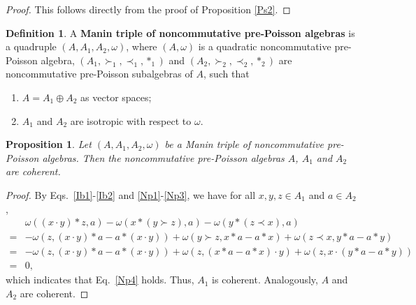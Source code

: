 \documentclass[12pt]{amsart}
\newtheorem{pro}[thm]{Proposition}
\theoremstyle{definition}
\newtheorem{defi}[thm]{Definition}
\begin{document}
\begin{proof} This follows directly from the proof of Proposition \ref{Ps2}. \end{proof}

\begin{defi}\label{defi:Manin}
  A {\bf Manin triple of noncommutative pre-Poisson algebras} is a quadruple $(A,A_1,A_2,\omega)$, 
  where $(A,\omega)$ is a quadratic noncommutative pre-Poisson algebra, 
  $(A_1,\succ_1,\prec_1,\ast_1)$ and $(A_2,\succ_2,\prec_2,\ast_2)$ are noncommutative pre-Poisson subalgebras of $A$,
  such that
  \begin{enumerate}
\item $A=A_1\oplus A_2$ as vector spaces;
\item $A_1$ and $A_2$ are isotropic with respect to $\omega$.
\end{enumerate}
 \end{defi}
 
\begin{pro} \label{Ps4}
Let $(A,A_1,A_2,\omega)$ be a Manin triple of noncommutative pre-Poisson algebras. 
Then the noncommutative pre-Poisson algebras $A$, $A_1$ and $A_2$ are coherent.
\end{pro}
\begin{proof} By Eqs.~\eqref{Ib1}-\eqref{Ib2}  and \eqref{Np1}-\eqref{Np3},
 we have for all $x,y,z\in A_1$ and $a\in A_2$, 
\begin{align*}&\omega((x\cdot y)\ast z,a)-\omega(x\ast(y\succ z),a)-\omega(y\ast(z\prec x),a)
\\=&-\omega(z,(x\cdot y)\ast a-a\ast(x\cdot y))
+\omega(y\succ z,x\ast a-a\ast x)+\omega( z\prec x,y\ast a-a\ast y)
\\=&-\omega(z,(x\cdot y)\ast a-a\ast(x\cdot y))
+\omega( z,(x\ast a-a\ast x)\cdot y)
+\omega( z,x\cdot (y\ast a-a\ast y))
\\=&0,\end{align*}
which indicates that Eq.~\eqref{Np4} holds. Thus, $A_1$ is coherent. Analogously,
$A$ and $A_2$ are coherent.
\end{proof}
\end{document}
